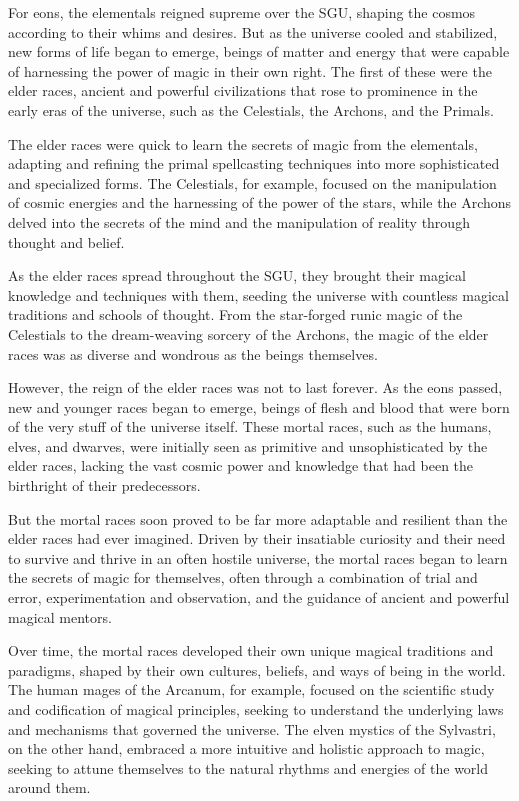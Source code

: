 \documentclass[12pt]{article}
\begin{document}
For eons, the elementals reigned supreme over the SGU, shaping the cosmos according to their whims and desires. But as the universe cooled and stabilized, new forms of life began to emerge, beings of matter and energy that were capable of harnessing the power of magic in their own right. The first of these were the elder races, ancient and powerful civilizations that rose to prominence in the early eras of the universe, such as the Celestials, the Archons, and the Primals.

The elder races were quick to learn the secrets of magic from the elementals, adapting and refining the primal spellcasting techniques into more sophisticated and specialized forms. The Celestials, for example, focused on the manipulation of cosmic energies and the harnessing of the power of the stars, while the Archons delved into the secrets of the mind and the manipulation of reality through thought and belief.

As the elder races spread throughout the SGU, they brought their magical knowledge and techniques with them, seeding the universe with countless magical traditions and schools of thought. From the star-forged runic magic of the Celestials to the dream-weaving sorcery of the Archons, the magic of the elder races was as diverse and wondrous as the beings themselves.

However, the reign of the elder races was not to last forever. As the eons passed, new and younger races began to emerge, beings of flesh and blood that were born of the very stuff of the universe itself. These mortal races, such as the humans, elves, and dwarves, were initially seen as primitive and unsophisticated by the elder races, lacking the vast cosmic power and knowledge that had been the birthright of their predecessors.

But the mortal races soon proved to be far more adaptable and resilient than the elder races had ever imagined. Driven by their insatiable curiosity and their need to survive and thrive in an often hostile universe, the mortal races began to learn the secrets of magic for themselves, often through a combination of trial and error, experimentation and observation, and the guidance of ancient and powerful magical mentors.

Over time, the mortal races developed their own unique magical traditions and paradigms, shaped by their own cultures, beliefs, and ways of being in the world. The human mages of the Arcanum, for example, focused on the scientific study and codification of magical principles, seeking to understand the underlying laws and mechanisms that governed the universe. The elven mystics of the Sylvastri, on the other hand, embraced a more intuitive and holistic approach to magic, seeking to attune themselves to the natural rhythms and energies of the world around them.
\end{document}
